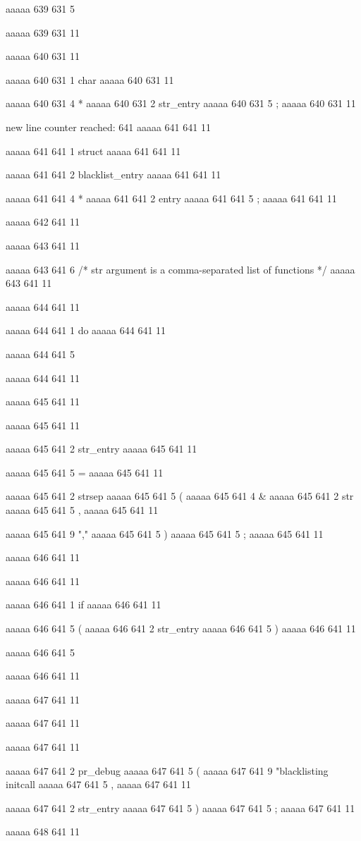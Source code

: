aaaaa 639 631
5
{
aaaaa 639 631
11


aaaaa 640 631
11
	
aaaaa 640 631
1
char
aaaaa 640 631
11
 
aaaaa 640 631
4
*
aaaaa 640 631
2
str_entry
aaaaa 640 631
5
;
aaaaa 640 631
11


new line counter reached: 641
aaaaa 641 641
11
	
aaaaa 641 641
1
struct
aaaaa 641 641
11
 
aaaaa 641 641
2
blacklist_entry
aaaaa 641 641
11
 
aaaaa 641 641
4
*
aaaaa 641 641
2
entry
aaaaa 641 641
5
;
aaaaa 641 641
11


aaaaa 642 641
11


aaaaa 643 641
11
	
aaaaa 643 641
6
/* str argument is a comma-separated list of functions */
aaaaa 643 641
11


aaaaa 644 641
11
	
aaaaa 644 641
1
do
aaaaa 644 641
11
 
aaaaa 644 641
5
{
aaaaa 644 641
11


aaaaa 645 641
11
	
aaaaa 645 641
11
	
aaaaa 645 641
2
str_entry
aaaaa 645 641
11
 
aaaaa 645 641
5
=
aaaaa 645 641
11
 
aaaaa 645 641
2
strsep
aaaaa 645 641
5
(
aaaaa 645 641
4
&
aaaaa 645 641
2
str
aaaaa 645 641
5
,
aaaaa 645 641
11
 
aaaaa 645 641
9
","
aaaaa 645 641
5
)
aaaaa 645 641
5
;
aaaaa 645 641
11


aaaaa 646 641
11
	
aaaaa 646 641
11
	
aaaaa 646 641
1
if
aaaaa 646 641
11
 
aaaaa 646 641
5
(
aaaaa 646 641
2
str_entry
aaaaa 646 641
5
)
aaaaa 646 641
11
 
aaaaa 646 641
5
{
aaaaa 646 641
11


aaaaa 647 641
11
	
aaaaa 647 641
11
	
aaaaa 647 641
11
	
aaaaa 647 641
2
pr_debug
aaaaa 647 641
5
(
aaaaa 647 641
9
"blacklisting initcall %
aaaaa 647 641
5
,
aaaaa 647 641
11
 
aaaaa 647 641
2
str_entry
aaaaa 647 641
5
)
aaaaa 647 641
5
;
aaaaa 647 641
11


aaaaa 648 641
11
	
}}}
